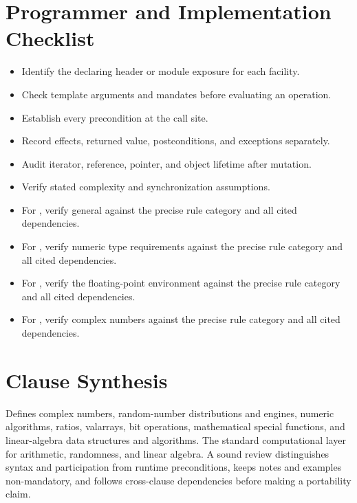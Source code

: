 \documentclass[11pt,letterpaper]{article}
\begin{document}
\section{Programmer and Implementation Checklist}
\begin{CornellReferenceChecklistBox}\begin{itemize}[label=$\square$]
\item Identify the declaring header or module exposure for each facility.
\item Check template arguments and mandates before evaluating an operation.
\item Establish every precondition at the call site.
\item Record effects, returned value, postconditions, and exceptions separately.
\item Audit iterator, reference, pointer, and object lifetime after mutation.
\item Verify stated complexity and synchronization assumptions.
\item For , verify general against the precise rule category and all cited dependencies.
\item For , verify numeric type requirements against the precise rule category and all cited dependencies.
\item For , verify the floating-point environment against the precise rule category and all cited dependencies.
\item For , verify complex numbers against the precise rule category and all cited dependencies.
\end{itemize}\end{CornellReferenceChecklistBox}
\section{Clause Synthesis}
\begin{CornellReferenceOrientationBox}Defines complex numbers, random-number distributions and engines, numeric algorithms, ratios, valarrays, bit operations, mathematical special functions, and linear-algebra data structures and algorithms. The standard computational layer for arithmetic, randomness, and linear algebra. A sound review distinguishes syntax and participation from runtime preconditions, keeps notes and examples non-mandatory, and follows cross-clause dependencies before making a portability claim.\end{CornellReferenceOrientationBox}
\end{document}
